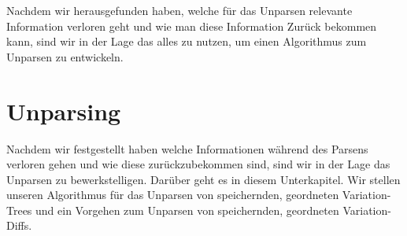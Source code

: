 Nachdem wir herausgefunden haben, welche für das Unparsen relevante Information verloren geht und wie man diese Information Zurück bekommen kann, sind wir in der Lage das alles zu nutzen, um einen Algorithmus zum Unparsen zu entwickeln.


\section{Unparsing}



Nachdem wir festgestellt haben welche Informationen während des Parsens verloren gehen und wie diese zurückzubekommen sind, sind wir in der Lage das Unparsen zu bewerkstelligen. Darüber geht es in diesem Unterkapitel. Wir stellen unseren Algorithmus für das Unparsen von speichernden, geordneten Variation-Trees und ein Vorgehen zum Unparsen von speichernden, geordneten Variation-Diffs.\\


